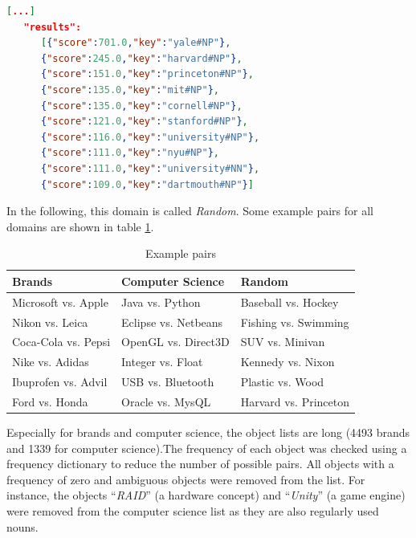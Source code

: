 \begin{minipage}{\linewidth}

\begin{lstlisting}[language=json,label=lst:jbtres,caption=Similar words to "Yale"]
[...]
   "results":
      [{"score":701.0,"key":"yale#NP"},
      {"score":245.0,"key":"harvard#NP"},
      {"score":151.0,"key":"princeton#NP"},
      {"score":135.0,"key":"mit#NP"},
      {"score":135.0,"key":"cornell#NP"},
      {"score":121.0,"key":"stanford#NP"},
      {"score":116.0,"key":"university#NP"},
      {"score":111.0,"key":"nyu#NP"},
      {"score":111.0,"key":"university#NN"},
      {"score":109.0,"key":"dartmouth#NP"}]
\end{lstlisting}
\end{minipage}
In the following, this domain is called \emph{Random}. Some example pairs for all domains are shown in table \ref{tbl:exp_pairs}.
\begin{table}[h]
\centering
\caption{Example pairs}
\label{tbl:exp_pairs}

\begin{tabularx}{\textwidth}{XXX}
\toprule
Brands & Computer Science & Random \\
\midrule
Microsoft vs. Apple & Java vs. Python & Baseball vs. Hockey \\
Nikon vs. Leica & Eclipse vs. Netbeans & Fishing vs. Swimming\\
Coca-Cola vs. Pepsi & OpenGL vs. Direct3D & SUV vs. Minivan\\
Nike vs. Adidas & Integer vs. Float & Kennedy vs. Nixon\\
Ibuprofen vs. Advil & USB vs. Bluetooth & Plastic vs. Wood\\
Ford vs. Honda & Oracle vs. MysQL & Harvard vs. Princeton\\

\bottomrule

\end{tabularx}

\end{table}

Especially for brands and computer science, the object lists are long (4493 brands and 1339 for computer science).The frequency of each object was checked using a frequency dictionary to reduce the number of possible pairs. All objects with a frequency of zero and ambiguous objects were removed from the list. For instance, the objects \enquote{\emph{RAID}} (a hardware concept) and \enquote{\emph{Unity}}  (a game engine) were removed from the computer science list as they are also regularly used nouns.

